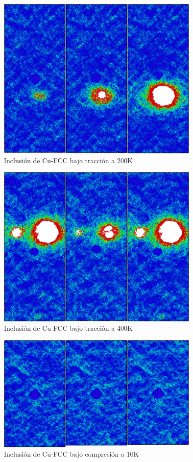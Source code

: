 \documentclass[10pt, oneside]{article} %
\begin{document}
\begin{figure}[H]
\centering
\includegraphics[width=10cm]{Figures/NanoParticles/Snapshots/cuSphereTension_200K_Snapshots.png}
\caption{Inclusión de Cu-FCC bajo tracción a 200K}
\end{figure}

\begin{figure}[H]
\centering
\includegraphics[width=10cm]{Figures/NanoParticles/Snapshots/cuSphereTension_400K_Snapshots.png}
\caption{Inclusión de Cu-FCC bajo tracción a 400K}
\end{figure}

\begin{figure}[H]
\centering
\includegraphics[width=10cm]{Figures/NanoParticles/Snapshots/cuSphereCompression_10K_Snapshots.png}
\caption{Inclusión de Cu-FCC bajo compresión a 10K}
\end{figure}
\end{document}
